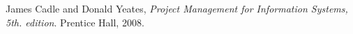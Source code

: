 \begin{thebibliography}{9}
	  James Cadle and Donald Yeates,
	  \emph{Project Management for Information Systems, 5th. edition}.
	  Prentice Hall,
	  2008.
\end{thebibliography}
